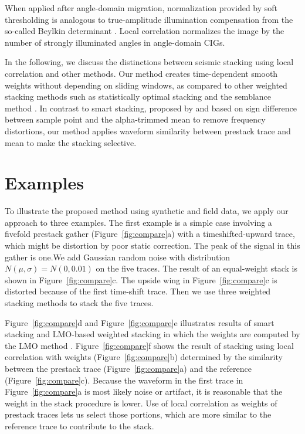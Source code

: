 When applied after angle-domain migration, normalization provided by soft 
thresholding is analogous to true-amplitude illumination compensation from the 
so-called Beylkin determinant \cite[]{Albertin99,Audebert05}. Local correlation 
normalizes the image by the number of strongly illuminated angles in 
angle-domain CIGs.

In the following, we discuss the distinctions between seismic
stacking using local correlation and other methods. Our method creates
time-dependent smooth weights without depending on sliding
windows, as compared to other weighted stacking methods such as
statistically optimal stacking \cite[]{Robinson70,Neelamani06} and 
the semblance method \cite[]{Yilmaz01}. In contrast to
smart stacking, proposed by \cite[]{Rashed08} and based on sign difference
between sample point and the alpha-trimmed mean to remove
frequency distortions, our method applies waveform similarity between
prestack trace and mean to make the stacking selective.

 \section{Examples}

To illustrate the proposed method using synthetic and field data,
we apply our approach to three examples. The first example is a simple
case involving a fivefold prestack gather (Figure~\ref{fig:compare}a) with a 
timeshifted-upward trace, which might be distortion by poor static correction.
The peak of the signal in this gather is one.We add Gaussian
random noise with distribution $N(\mu,\sigma)=N(0,0.01)$ on the five
traces. The result of an equal-weight stack is shown in 
Figure~\ref{fig:compare}c. The upside wing in Figure~\ref{fig:compare}c is 
distorted because of the first time-shift
trace. Then we use three weighted stacking methods to stack the five
traces.

Figure~\ref{fig:compare}d and Figure~\ref{fig:compare}e illustrates results 
of smart stacking \cite[]{Rashed08} and LMO-based weighted stacking in which 
the weights are computed by the LMO method \cite[]{Robinson70,Neelamani06}. 
Figure~\ref{fig:compare}f shows the result of stacking using local correlation
with weights (Figure~\ref{fig:compare}b) determined by the similarity between 
the prestack trace (Figure~\ref{fig:compare}a) and the reference 
(Figure~\ref{fig:compare}c). Because the waveform in the first trace in 
Figure~\ref{fig:compare}a is most likely 
noise or artifact, it is reasonable that the weight in the stack procedure is 
lower. Use of local correlation as weights of prestack traces lets us select
those portions, which are more similar to the reference trace to contribute
to the stack.

